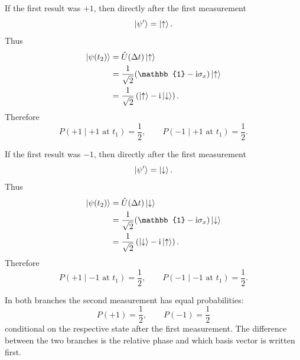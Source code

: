 \documentclass[11pt,a4paper]{scrartcl}
\newcommand{\ii}{\mathrm{i}}
\newcommand{\op}[1]{\hat{#1}}
\begin{document}
\begin{enumerate}[label=(\alph*)]
\begin{calculationbox}
            \begin{calculationbox}
                If the first result was $+1$, then directly after the first measurement
                \[
                    \ket{\psi'}=\ket{\uparrow}.
                \]
                Thus
                \begin{align*}
                    \ket{\psi(t_2)}
                    &= \op{U}(\Delta t)\ket{\uparrow} \\
                    &= \frac{1}{\sqrt{2}}(\mathbb{1}-\ii\sigma_x)\ket{\uparrow} \\
                    &= \frac{1}{\sqrt{2}}\left(\ket{\uparrow}-\ii\ket{\downarrow}\right).
                \end{align*}
                Therefore
                \[
                    P(+1\mid +1 \text{ at } t_1)=\frac12,
                    \qquad
                    P(-1\mid +1 \text{ at } t_1)=\frac12.
                \]
            \end{calculationbox}

            \begin{calculationbox}
                If the first result was $-1$, then directly after the first measurement
                \[
                    \ket{\psi'}=\ket{\downarrow}.
                \]
                Thus
                \begin{align*}
                    \ket{\psi(t_2)}
                    &= \op{U}(\Delta t)\ket{\downarrow} \\
                    &= \frac{1}{\sqrt{2}}(\mathbb{1}-\ii\sigma_x)\ket{\downarrow} \\
                    &= \frac{1}{\sqrt{2}}\left(\ket{\downarrow}-\ii\ket{\uparrow}\right).
                \end{align*}
                Therefore
                \[
                    P(+1\mid -1 \text{ at } t_1)=\frac12,
                    \qquad
                    P(-1\mid -1 \text{ at } t_1)=\frac12.
                \]
            \end{calculationbox}
        \end{calculationbox}

        \begin{answerbox}
            In both branches the second measurement has equal probabilities:
            \[
                \boxed{P(+1)=\frac12, \qquad P(-1)=\frac12}
            \]
            conditional on the respective state after the first measurement. The difference between the two branches is the relative phase and which basis vector is written first.
        \end{answerbox}


\end{enumerate}
\end{document}
